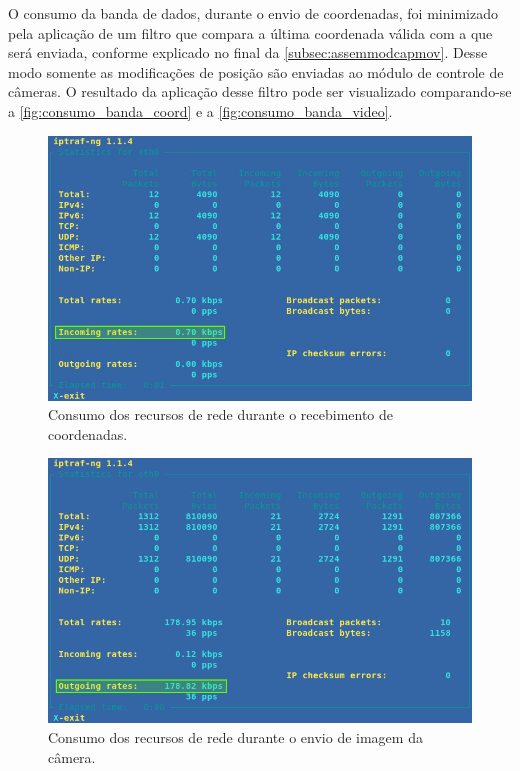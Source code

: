 O consumo da banda de dados, durante o envio de coordenadas, foi minimizado pela aplicação de um filtro que compara a última coordenada válida com a que será enviada, conforme explicado no final da \autoref{subsec:assemmodcapmov}. Desse modo somente as modificações de posição são enviadas ao módulo de controle de câmeras. O resultado da aplicação desse filtro pode ser visualizado comparando-se a \autoref{fig:consumo_banda_coord} e a \autoref{fig:consumo_banda_video}.\par

\begin{figure}[H]
	\centering
	\includegraphics[width=1\textwidth]{figuras/consumo_banda.jpg}
	\caption{Consumo dos recursos de rede durante o recebimento de coordenadas.}
	\label{fig:consumo_banda_coord}
\end{figure}

\begin{figure}[H]
	\centering
	\includegraphics[width=1\textwidth]{figuras/consumo_banda_camera.png}
	\caption{Consumo dos recursos de rede durante o envio de imagem da câmera.}
	\label{fig:consumo_banda_video}
\end{figure}

